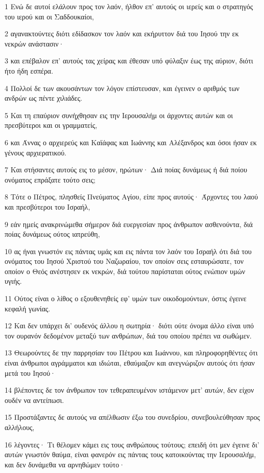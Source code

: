 \par 1 Ενώ δε αυτοί ελάλουν προς τον λαόν, ήλθον επ' αυτούς οι ιερείς και ο στρατηγός του ιερού και οι Σαδδουκαίοι,
\par 2 αγανακτούντες διότι εδίδασκον τον λαόν και εκήρυττον διά του Ιησού την εκ νεκρών ανάστασιν·
\par 3 και επέβαλον επ' αυτούς τας χείρας και έθεσαν υπό φύλαξιν έως της αύριον, διότι ήτο ήδη εσπέρα.
\par 4 Πολλοί δε των ακουσάντων τον λόγον επίστευσαν, και έγεινεν ο αριθμός των ανδρών ως πέντε χιλιάδες.
\par 5 Και τη επαύριον συνήχθησαν εις την Ιερουσαλήμ οι άρχοντες αυτών και οι πρεσβύτεροι και οι γραμματείς,
\par 6 και Άννας ο αρχιερεύς και Καϊάφας και Ιωάννης και Αλέξανδρος και όσοι ήσαν εκ γένους αρχιερατικού.
\par 7 Και στήσαντες αυτούς εις το μέσον, ηρώτων· Διά ποίας δυνάμεως ή διά ποίου ονόματος επράξατε τούτο σεις;
\par 8 Τότε ο Πέτρος, πλησθείς Πνεύματος Αγίου, είπε προς αυτούς· Άρχοντες του λαού και πρεσβύτεροι του Ισραήλ,
\par 9 εάν ημείς ανακρινώμεθα σήμερον διά ευεργεσίαν προς άνθρωπον ασθενούντα, διά ποίας δυνάμεως ούτος ιατρεύθη,
\par 10 ας ήναι γνωστόν εις πάντας υμάς και εις πάντα τον λαόν του Ισραήλ ότι διά του ονόματος του Ιησού Χριστού του Ναζωραίου, τον οποίον σεις εσταυρώσατε, τον οποίον ο Θεός ανέστησεν εκ νεκρών, διά τούτου παρίσταται ούτος ενώπιον υμών υγιής.
\par 11 Ούτος είναι ο λίθος ο εξουθενηθείς εφ' υμών των οικοδομούντων, όστις έγεινε κεφαλή γωνίας.
\par 12 Και δεν υπάρχει δι' ουδενός άλλου η σωτηρία· διότι ούτε όνομα άλλο είναι υπό τον ουρανόν δεδομένον μεταξύ των ανθρώπων, διά του οποίου πρέπει να σωθώμεν.
\par 13 Θεωρούντες δε την παρρησίαν του Πέτρου και Ιωάννου, και πληροφορηθέντες ότι είναι άνθρωποι αγράμματοι και ιδιώται, εθαύμαζον και ανεγνώριζον αυτούς ότι ήσαν μετά του Ιησού·
\par 14 βλέποντες δε τον άνθρωπον τον τεθεραπευμένον ιστάμενον μετ' αυτών, δεν είχον ουδέν να αντείπωσι.
\par 15 Προστάξαντες δε αυτούς να απέλθωσιν έξω του συνεδρίου, συνεβουλεύθησαν προς αλλήλους,
\par 16 λέγοντες· Τι θέλομεν κάμει εις τους ανθρώπους τούτους; επειδή ότι μεν έγεινε δι' αυτών γνωστόν θαύμα, είναι φανερόν εις πάντας τους κατοικούντας την Ιερουσαλήμ, και δεν δυνάμεθα να αρνηθώμεν τούτο·
